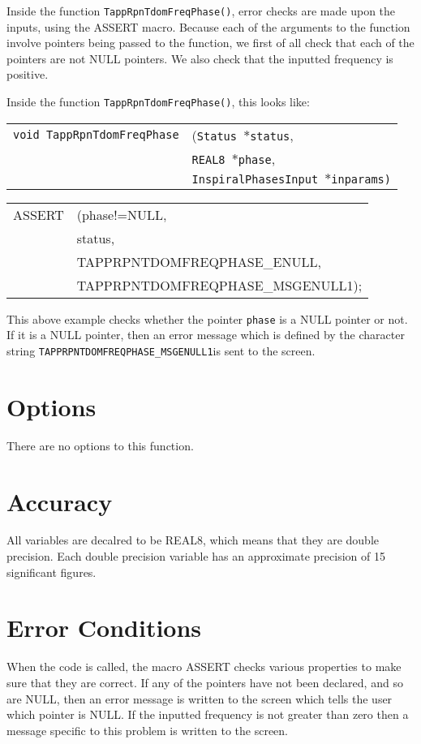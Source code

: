 \documentclass[12pt]{article}
\begin{document}
Inside the function \texttt{TappRpnTdomFreqPhase()}, error checks are made upon the inputs, using the ASSERT macro. Because each of the arguments to the function involve pointers being passed to the function, we first of all check that each of the pointers are not NULL pointers. We also check that the inputted frequency is positive.

Inside the function \texttt{TappRpnTdomFreqPhase()}, this looks like:

\vspace{5mm}

\begin{tabular}{ll}
\texttt{void TappRpnTdomFreqPhase} & (\texttt{Status $\ast$status}, \\
                        & \texttt{REAL8 $\ast$phase}, \\
                        & \texttt{InspiralPhasesInput $\ast$inparams)}
\end{tabular}

\vspace{5mm}

\begin{tabular}{ll}
ASSERT & (phase!=NULL,  \\
       &  status,    \\
       &  TAPPRPNTDOMFREQPHASE\_ENULL, \\
       &  TAPPRPNTDOMFREQPHASE\_MSGENULL1);
\end{tabular}

\vspace{5mm}

This above example checks whether the pointer \texttt{phase} is a NULL pointer or not. If it is a NULL pointer, then an error message which is defined by the character string \texttt{TAPPRPNTDOMFREQPHASE\_MSGENULL1}is sent to the screen.



\section{Options}
There are no options to this function.

\section{Accuracy}
All variables are decalred to be REAL8, which means that they are double precision.
Each double precision variable has an approximate precision of 15 significant figures.

\section{Error Conditions}
When the code is called, the macro ASSERT checks various properties to make sure that they are correct. If any of the pointers have not been declared, and so are NULL, then an  error message is written to the screen which tells the user which pointer is NULL. If the inputted frequency is not greater than zero then a message specific to this problem is written to the screen. 
\end{document}

